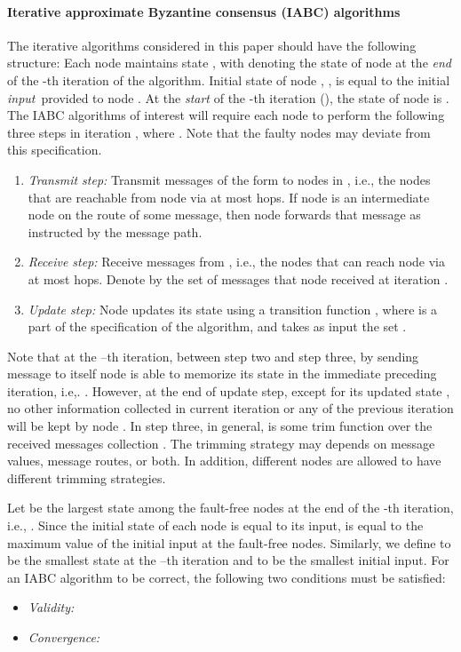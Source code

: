 \documentclass[letterpaper, 11pt]{article}
\begin{document}
\paragraph{Iterative approximate Byzantine consensus (IABC) algorithms}
\label{sec:iabc}

The iterative algorithms considered in this paper should have the following structure:
Each node  maintains state , with  denoting the state
of node  at the {\em end}\, of the -th iteration of the algorithm.
Initial state of node ,
, is equal to the initial {\em input}\, provided to node .
At the {\em start} of the -th iteration (), the state of
node  is .
The IABC algorithms of interest will require each node 
to perform the following three steps in iteration , where .
Note that the faulty nodes may deviate from this specification.

\begin{enumerate}
\item {\em Transmit step:} Transmit messages of the form  to nodes in , i.e., the nodes that are reachable from node  via at most  hops. If node  is an intermediate node on the route of some message, then node  forwards that message as instructed by the message path.
\item {\em Receive step:} Receive messages from , i.e., the nodes that can reach node  via at most  hops.
Denote by  the set of messages that node  received
at iteration . \item \textit{Update step:} Node  updates its state using a transition function , where  is a part of the specification of the algorithm, and takes as input the set .
\end{enumerate}
Note that at the --th iteration, between step two and step three, by sending message to itself node  is able to memorize its state in the immediate preceding iteration, i.e,. . However, at the end of update step, except for its updated state , no other information collected in current iteration or any of the previous iteration will be kept by node . In step three, in general,  is some trim function over the received messages collection . The trimming strategy may depends on message values, message routes, or both. In addition, different nodes are allowed to have different trimming strategies.

Let  be the largest state among the fault-free nodes at the end of the -th iteration, i.e., .
Since the initial state of each node is equal to its input,
 is equal to the maximum value of the initial input at the fault-free nodes. Similarly, we define  to be the smallest state at the --th iteration and  to be the smallest initial input.
For an IABC algorithm to be correct, the following two conditions must be satisfied:
\begin{itemize}
\item {\em Validity:} 

\item {\em Convergence:} 
\end{itemize}
\end{document}
